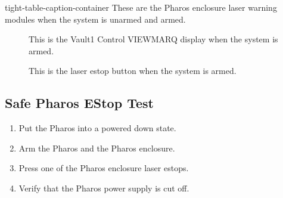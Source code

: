 \documentclass[letterpaper,10pt,english]{sphinxmanual}
\begin{document}
\begin{sphinxuseclass}{tight-table-caption-container}
\sphinxAtStartPar
{} These are the Pharos enclosure laser warning modules when the system is unarmed and armed.

\end{sphinxuseclass}
\begin{figure}[htbp]
\centering
\capstart

\noindent{}
\caption{ This is the Vault\sphinxhyphen{}1 Control VIEWMARQ display when the system is armed.}\label{\detokenize{testing_documentation/Vault-1_laser:id10}}\end{figure}

\begin{figure}[htbp]
\centering
\capstart

\noindent{}
\caption{ This is the laser e\sphinxhyphen{}stop button when the system is armed.}\label{\detokenize{testing_documentation/Vault-1_laser:id11}}\end{figure}


\subsection{Safe Pharos E\sphinxhyphen{}Stop Test}
\label{\detokenize{testing_documentation/Vault-1_laser:safe-pharos-e-stop-test}}\begin{enumerate}
%
\item {} 
\sphinxAtStartPar
Put the Pharos into a powered down state.

\item {} 
\sphinxAtStartPar
Arm the Pharos and the Pharos enclosure.

\item {} 
\sphinxAtStartPar
Press one of the Pharos enclosure laser e\sphinxhyphen{}stops.

\item {} 
\sphinxAtStartPar
Verify that the Pharos power supply is cut off.

\end{enumerate}
\end{document}

